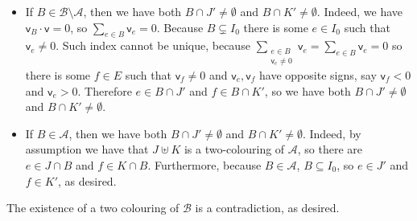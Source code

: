 \documentclass[kulak]{tplt}
\theoremstyle{definition}
\newcommand{\vv}{\mathsf{v}}
\begin{document}
\begin{enumerate}
\begin{itemize}
\item If $B \in \mathcal B \setminus \mathcal A$, then we have both $B \cap J' \neq \emptyset $ and $B \cap K' \neq \emptyset $.
Indeed, we have $\vv_B \cdot \vv = 0 $, so $\sum_{e\in B} \vv_e = 0$.
Because $B \subsetneq I_0$ there is some $e \in I_0$ such that $\vv_e \neq 0$.
Such index cannot be unique, because $\sum_{\substack{e\in B \\ \vv_e \neq 0}} \vv_e  = \sum_{e\in B} \vv_e = 0$ so there is some $f \in E$ such that $\vv_f\neq 0 $ and $\vv_e, \vv_f$ have opposite signs, say $\vv_f <0 $ and $\vv_e > 0$.
Therefore $e \in B \cap J'$ and $f \in B \cap K'$, so we have both $B \cap J' \neq \emptyset $ and $B \cap K' \neq \emptyset $.

\item If $B \in \mathcal A$, then we have both $B \cap J' \neq \emptyset $ and $B \cap K' \neq \emptyset $.
Indeed, by assumption we have that  $J\uplus K $ is a two-colouring of $\mathcal A$, so there are $e \in J\cap B$ and $f\in K\cap B$.
Furthermore, because $B \in \mathcal A$, $B \subseteq I_0$, so $e \in J'$ and $f \in K'$, as desired. 
\end{itemize}

The existence of a two colouring of $\mathcal B$ is a contradiction, as desired.
\end{enumerate}
\end{document}
